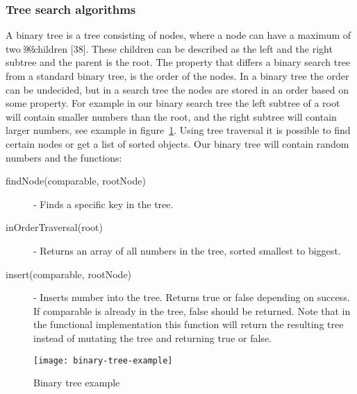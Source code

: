 \documentclass {article}
\begin{document}
\subsubsection{Tree search algorithms}
A binary tree is a tree consisting of nodes, where a node can have a maximum of two ￼children [38]. These children can be described as the left and the right subtree and the parent is the root. The property that differs a binary search tree from a standard binary tree, is the order of the nodes. In a binary tree the order can be undecided, but in a search tree the nodes are stored in an order based on some property. For example in our binary search tree the left subtree of a root will contain smaller numbers than the root, and the right subtree will contain larger numbers, see example in figure~\ref{fig:binary-tree-example}. Using tree traversal it is possible to find certain nodes or get a list of sorted objects. Our binary tree will contain random numbers and the functions:
\begin{description}
\item [findNode(comparable, rootNode)] - Finds a specific key in the tree.
\item [inOrderTraversal(root)] - Returns an array of all numbers in the tree, sorted smallest to biggest.
\item [insert(comparable, rootNode)] - Inserts number into the tree. Returns true or false depending on success. If comparable is already in the tree, false should be returned. Note that in the functional implementation this function will return the resulting tree instead of mutating the tree and returning true or false.
\end{description}

\begin{figure}[H]
\texttt{[image: binary-tree-example]}


\caption {Binary tree example}
\label{fig:binary-tree-example}
\end {figure}
\end{document}
